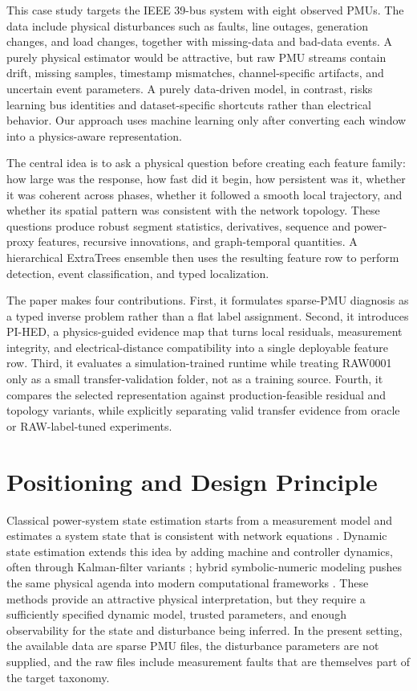 \documentclass[conference]{IEEEtran}
\begin{document}
This case study targets the IEEE 39-bus system with eight observed PMUs. The data include physical disturbances such as faults, line outages, generation changes, and load changes, together with missing-data and bad-data events. A purely physical estimator would be attractive, but raw PMU streams contain drift, missing samples, timestamp mismatches, channel-specific artifacts, and uncertain event parameters. A purely data-driven model, in contrast, risks learning bus identities and dataset-specific shortcuts rather than electrical behavior. Our approach uses machine learning only after converting each window into a physics-aware representation.

The central idea is to ask a physical question before creating each feature family: how large was the response, how fast did it begin, how persistent was it, whether it was coherent across phases, whether it followed a smooth local trajectory, and whether its spatial pattern was consistent with the network topology. These questions produce robust segment statistics, derivatives, sequence and power-proxy features, recursive innovations, and graph-temporal quantities. A hierarchical ExtraTrees ensemble \cite{geurts2006} then uses the resulting feature row to perform detection, event classification, and typed localization.

The paper makes four contributions. First, it formulates sparse-PMU diagnosis as a typed inverse problem rather than a flat label assignment. Second, it introduces PI-HED, a physics-guided evidence map that turns local residuals, measurement integrity, and electrical-distance compatibility into a single deployable feature row. Third, it evaluates a simulation-trained runtime while treating RAW0001 only as a small transfer-validation folder, not as a training source. Fourth, it compares the selected representation against production-feasible residual and topology variants, while explicitly separating valid transfer evidence from oracle or RAW-label-tuned experiments.

\section{Positioning and Design Principle}
\label{sec:positioning}
Classical power-system state estimation starts from a measurement model and estimates a system state that is consistent with network equations \cite{schweppe1970}. Dynamic state estimation extends this idea by adding machine and controller dynamics, often through Kalman-filter variants \cite{kalman1960,kundur1994}; hybrid symbolic-numeric modeling pushes the same physical agenda into modern computational frameworks \cite{cui2021}. These methods provide an attractive physical interpretation, but they require a sufficiently specified dynamic model, trusted parameters, and enough observability for the state and disturbance being inferred. In the present setting, the available data are sparse PMU files, the disturbance parameters are not supplied, and the raw files include measurement faults that are themselves part of the target taxonomy.
\end{document}
